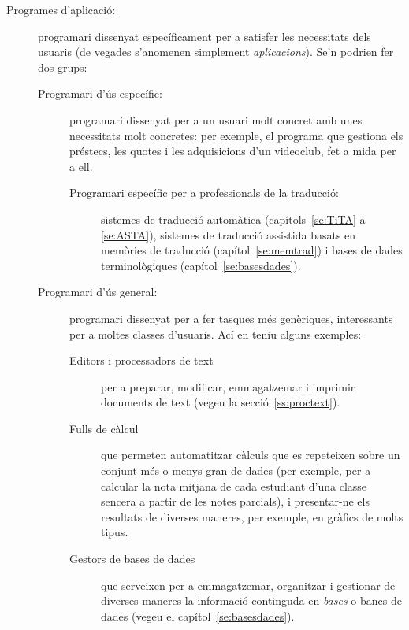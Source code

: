 \begin{description}
\item[Programes d'aplicació:] programari dissenyat específicament per
  a satisfer les necessitats dels usuaris (de vegades s'anomenen
  simplement {\em aplicacions}). Se'n podrien fer dos grups:
  \begin{description}
  \item[Programari d'ús específic:] programari dissenyat per a un
    usuari molt concret amb unes necessitats molt concretes: per
    exemple, el programa que gestiona els préstecs, les quotes i les
    adquisicions d'un videoclub, fet a mida per a ell.
    \begin{description}
    \item[Programari específic per a professionals de la traducció:]
      sistemes de traducció automàtica (capítols~\ref{se:TiTA} a
      \ref{se:ASTA}), sistemes de traducció assistida basats en
      memòries de traducció (capítol~\ref{se:memtrad}) i bases de
      dades terminològiques (capítol~\ref{se:basesdades}).
    \end{description}
  \item[Programari d'ús general:] programari dissenyat per a fer
    tasques més genèriques, interessants per a moltes classes
    d'usuaris. Ací en teniu alguns exemples:
    \begin{description}
    \item[Editors i processadors de text] per a preparar, modificar,
      emmagatzemar i imprimir documents de text (vegeu la
      secció~\ref{ss:proctext}).
    \item[Fulls de càlcul] que permeten automatitzar càlculs que es
      repeteixen sobre un conjunt més o menys gran de dades (per
      exemple, per a calcular la nota mitjana de cada estudiant d'una
      classe sencera a partir de les notes parcials), i presentar-ne
      els resultats de diverses maneres, per exemple, en gràfics de
      molts tipus.
    \item[Gestors de bases de dades] \label{pg:BD} que serveixen per a
      emmagatzemar, organitzar i gestionar de diverses maneres la
      informació continguda en \emph{bases} o bancs de dades (vegeu el
      capítol~\ref{se:basesdades}).

\end{description}
\end{description}
\end{description}
